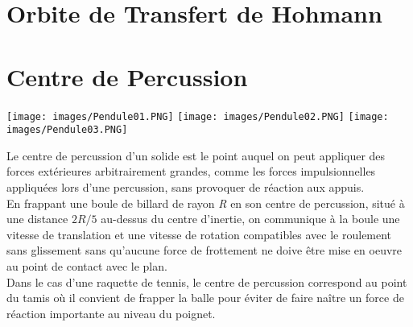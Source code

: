 \documentclass[a4paper]{article}
\begin{document}
\section{Orbite de Transfert de Hohmann}















\section{Centre de Percussion}





\begin{center}
\texttt{[image: images/Pendule01.PNG]}
\texttt{[image: images/Pendule02.PNG]}
\texttt{[image: images/Pendule03.PNG]}
\end{center}
Le centre de percussion d’un solide est le point auquel on peut appliquer des forces extérieures arbitrairement grandes, comme les forces impulsionnelles appliquées lors d’une percussion, sans provoquer de réaction aux appuis. \\
En frappant une boule de billard de rayon \emph{R} en son centre de percussion, situé à une distance $ 2 R / 5 $ au-dessus du centre d’inertie, on communique à la boule une vitesse de translation et une vitesse de rotation compatibles avec le roulement sans glissement sans qu’aucune force de frottement ne doive être mise en oeuvre au point de contact avec le plan. \\
Dans le cas d’une raquette de tennis, le centre de percussion correspond au point du tamis où il convient de frapper la balle pour éviter de faire naître un force de réaction importante au niveau du poignet.
\end{document}
